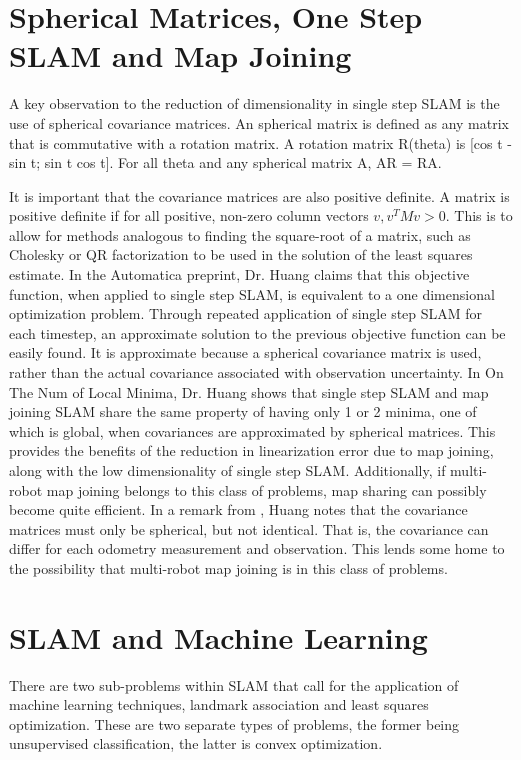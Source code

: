 \documentclass[12pt]{report}
\begin{document}
\section{ Spherical Matrices, One Step SLAM and Map Joining}
A key observation to the reduction of dimensionality in single step
SLAM is the use of spherical covariance matrices. An spherical matrix
is defined as any matrix that is commutative with a rotation matrix. A
rotation matrix R(theta) is [cos t -sin t; sin t cos t]. For all theta
and any spherical matrix A, AR = RA.

It is important that the covariance matrices are also positive
definite. A matrix is positive definite if for all positive, non-zero
column vectors $v, v^T Mv > 0$. This is to allow for methods analogous
to finding the square-root of a matrix, such as Cholesky or QR
factorization to be used in the solution of the least squares
estimate. In the Automatica preprint, Dr. Huang claims that this
objective function, when applied to single step SLAM, is equivalent to
a one dimensional optimization problem. Through repeated application
of single step SLAM for each timestep, an approximate solution to the
previous objective function can be easily found. It is approximate
because a spherical covariance matrix is used, rather than the actual
covariance associated with observation uncertainty. In On The Num of
Local Minima, Dr. Huang shows that single step SLAM and map joining
SLAM share the same property of having only 1 or 2 minima, one of
which is global, when covariances are approximated by spherical
matrices. This provides the benefits of the reduction in linearization
error due to map joining, along with the low dimensionality of single
step SLAM. Additionally, if multi-robot map joining belongs to this
class of problems, map sharing can possibly become quite efficient. In
a remark from \cite{onthenumber}, Huang notes that the covariance
matrices must only be spherical, but not identical. That is, the
covariance can differ for each odometry measurement and observation.
This lends some home to the possibility that multi-robot map joining
is in this class of problems.

\section{SLAM and Machine Learning}

There are two sub-problems within SLAM that call for the
application of machine learning techniques, landmark
association and least squares optimization. These are two
separate types of problems, the former being unsupervised
classification, the latter is convex optimization.
\end{document}
